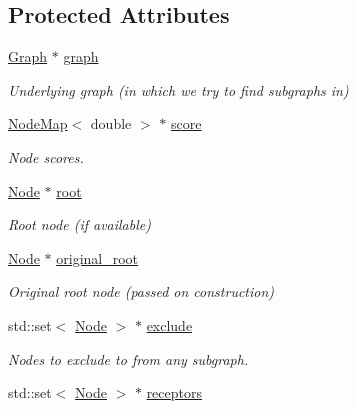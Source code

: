 \subsection*{Protected Attributes}
\begin{DoxyCompactItemize}
\item 
\hyperlink{namespacederegnet_a55b76c55bbabc682cbc61f8b9948799e}{Graph} $\ast$ \hyperlink{classderegnet_1_1DeregnetStartHeuristic_a4da8e53fc7c0fa3dbe0e3ef07296d75e}{graph}
\begin{DoxyCompactList}\small\item\em Underlying graph (in which we try to find subgraphs in) \end{DoxyCompactList}\item 
\hyperlink{namespacederegnet_ae102b707ae1d6f83c639ece5e0dd5658}{Node\+Map}$<$ double $>$ $\ast$ \hyperlink{classderegnet_1_1DeregnetStartHeuristic_ae03300e79482975e98f95cba19ad32b0}{score}
\begin{DoxyCompactList}\small\item\em Node scores. \end{DoxyCompactList}\item 
\hyperlink{namespacederegnet_a744bad34f2de9856d36715a445f027f3}{Node} $\ast$ \hyperlink{classderegnet_1_1DeregnetStartHeuristic_a4605d41352e3adf1f9f9f32466a4e61e}{root}
\begin{DoxyCompactList}\small\item\em Root node (if available) \end{DoxyCompactList}\item 
\hyperlink{namespacederegnet_a744bad34f2de9856d36715a445f027f3}{Node} $\ast$ \hyperlink{classderegnet_1_1DeregnetStartHeuristic_a22c9ec9b11605201c87dbac622d7618e}{original\+\_\+root}
\begin{DoxyCompactList}\small\item\em Original root node (passed on construction) \end{DoxyCompactList}\item 
std\+::set$<$ \hyperlink{namespacederegnet_a744bad34f2de9856d36715a445f027f3}{Node} $>$ $\ast$ \hyperlink{classderegnet_1_1DeregnetStartHeuristic_aa22c6581cd404bf7ac325850b28dc951}{exclude}
\begin{DoxyCompactList}\small\item\em Nodes to exclude to from any subgraph. \end{DoxyCompactList}\item 
std\+::set$<$ \hyperlink{namespacederegnet_a744bad34f2de9856d36715a445f027f3}{Node} $>$ $\ast$ \hyperlink{classderegnet_1_1DeregnetStartHeuristic_ab80c046ff2b7c64086fceb84987b3e50}{receptors}

\end{DoxyCompactItemize}
